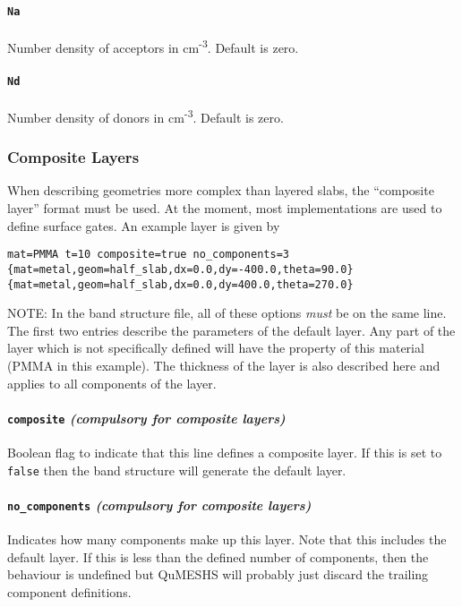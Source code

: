 \documentclass[12pt]{article}
\begin{document}
\paragraph{\texttt{Na}}
Number density of acceptors in cm\textsuperscript{-3}.  Default is zero.

\paragraph{\texttt{Nd}}
Number density of donors in cm\textsuperscript{-3}.  Default is zero.

\subsubsection{Composite Layers}

When describing geometries more complex than layered slabs, the ``composite layer'' format
must be used.  At the moment, most implementations are used to define surface gates.  An
example layer is given by
\begin{center}
\texttt{mat=PMMA t=10 composite=true no\_components=3 \{mat=metal,geom=half\_slab,dx=0.0,dy=-400.0,theta=90.0\} \{mat=metal,geom=half\_slab,dx=0.0,dy=400.0,theta=270.0\}}
\end{center}
{\color{red} NOTE:} In the band structure file, all of these options \emph{must} be on the
same line.  The first two entries describe the parameters of the default layer.  Any part
of the layer which is not specifically defined will have the property of this material
(PMMA in this example).  The thickness of the layer is also described here and applies to
all components of the layer.

\paragraph{\texttt{composite} \emph{(compulsory for composite layers)}}
Boolean flag to indicate that this line defines a composite layer.  If this is set to
\texttt{false} then the band structure will generate the default layer.

\paragraph{\texttt{no\_components} \emph{(compulsory for composite layers)}}
Indicates how many components make up this layer.  Note that this includes the default
layer.  If this is less than the defined number of components, then the behaviour is
undefined but QuMESHS will probably just discard the trailing component definitions.
\end{document}
